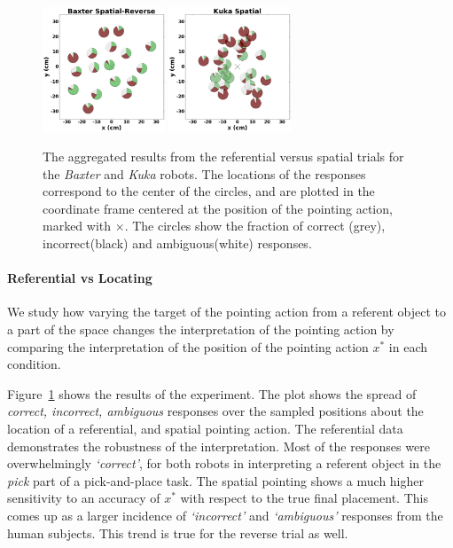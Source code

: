 \begin{figure}[th!]
    \includegraphics[width=0.325\textwidth ]{figures/baxter_Spatial-Reverse_.png}
    \includegraphics[width=0.325\textwidth ]{figures/kuka_Spatial_.png}
    \caption{The aggregated results from the referential versus spatial trials for the \textit{Baxter} and \textit{Kuka} robots. The locations of the responses correspond to the center of the circles, and are plotted in the coordinate frame centered at the position of the pointing action, marked with $\times$. The circles show the fraction of correct (grey), incorrect(black) and ambiguous(white) responses.}
    \label{fig:aggregatesimple}
\end{figure}

\paragraph{Referential vs Locating}
We study how varying the target of the pointing action from a referent object to a part of the space changes the interpretation of the pointing action by comparing the interpretation of the position of the pointing action $x^*$ in each condition. 

Figure~\ref{fig:aggregatesimple} shows the results of the experiment. The plot shows the spread of \textit{correct, incorrect, ambiguous} responses over the sampled positions about the location of a referential, and spatial pointing action. The referential data demonstrates the robustness of the interpretation. Most of the responses were overwhelmingly \textit{`correct'}, for both robots in interpreting a referent object in the \textit{pick} part of a pick-and-place task. The spatial pointing shows a much higher sensitivity to an accuracy of $x^*$ with respect to the true final placement. This comes up as a larger incidence of \textit{`incorrect'} and \textit{`ambiguous'} responses from the human subjects. This trend is true for the reverse trial as well.

